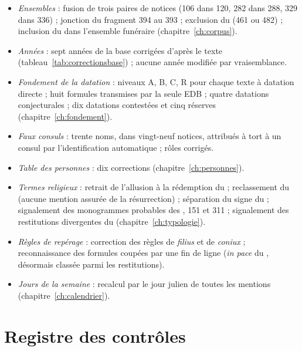 \begin{itemize}
\item \emph{Ensembles} : fusion de trois paires de notices (106 dans 120, 282 dans 288, 329 dans 336) ; jonction du fragment 394 au 393 ; exclusion du  (461 ou 482) ; inclusion du  dans l’ensemble funéraire (chapitre~\ref{ch:corpus}).
\item \emph{Années} : sept années de la base corrigées d’après le texte (tableau~\ref{tab:correctionsbase}) ; aucune année modifiée par vraisemblance.
\item \emph{Fondement de la datation} : niveaux A, B, C, R pour chaque texte à datation directe ; huit formules transmises par la seule EDB ; quatre datations conjecturales ; dix datations contestées et cinq réserves (chapitre~\ref{ch:fondement}).
\item \emph{Faux consuls} : trente noms, dans vingt-neuf notices, attribués à tort à un consul par l’identification automatique ; rôles corrigés.
\item \emph{Table des personnes} : dix corrections (chapitre~\ref{ch:personnes}).
\item \emph{Termes religieux} : retrait de l’allusion à la rédemption du  ; reclassement du  (aucune mention assurée de la résurrection) ; séparation du signe du  ; signalement des monogrammes probables des , 151 et 311 ; signalement des restitutions divergentes du  (chapitre~\ref{ch:typologie}).
\item \emph{Règles de repérage} : correction des règles de \emph{filius} et de \emph{coniux} ; reconnaissance des formules coupées par une fin de ligne (\emph{in pace} du , désormais classée parmi les restitutions).
\item \emph{Jours de la semaine} : recalcul par le jour julien de toutes les mentions (chapitre~\ref{ch:calendrier}).
\end{itemize}

\section{Registre des contrôles}


